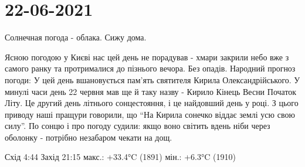 
 
 
 
 
\section{22-06-2021}

Солнечная погода - облака. Сижу дома.

Ясною погодою у Києві нас цей день не порадував - хмари закрили небо вже з
самого ранку та протрималися до пізнього вечора. Без опадів.  Народний прогноз
погоди: У цей день вшановується пам'ять святителя Кирила Олександрійського. У
минулі часи день 22 червня мав ще й таку назву - Кирило Кінець Весни Початок
Літу. Це другий день літнього сонцестояння, і це найдовший день у році. З цього
приводу наші пращури говорили, що \enquote{На Кирила сонечко віддає землі усю свою
силу}. По сонцю і про погоду судили: якщо воно світить вдень ніби через
оболонку - потрібно незабаром чекати на дощ.

Схід 4:44 Захід 21:15
макс.: +33.4°C (1891) мін.: +6.3°C (1910)

